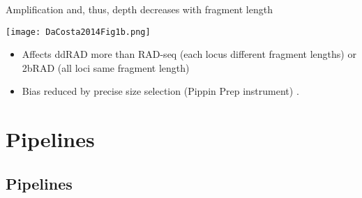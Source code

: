 \documentclass[presentation]{beamer}
\begin{document}
\begin{frame}[label={sec:org077a550}]{Amplification and, thus, depth decreases with fragment length}
\begin{latex}
\begin{center}
\end{latex}
\begin{center}
\texttt{[image: DaCosta2014Fig1b.png]}
\end{center}

\begin{itemize}
\item Affects ddRAD more than RAD-seq (each locus different fragment lengths) or 2bRAD (all loci same fragment length)
\end{itemize}

\begin{itemize}
\item Bias reduced by precise size selection (Pippin Prep instrument)
\citep{Dacosta2014}.
\end{itemize}
\end{frame}




\section{Pipelines}
\label{sec:org907ee7e}
\subsection{Pipelines}
\label{sec:orgf97e3c1}
\end{document}
